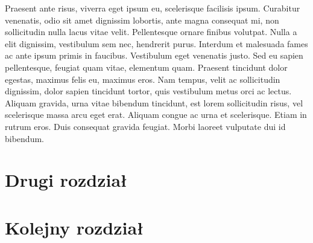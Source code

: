 \documentclass[a4paper,12pt,polish,twoside]{extreport}
\begin{document}
Praesent ante risus, viverra eget ipsum eu, scelerisque facilisis ipsum. Curabitur venenatis, odio sit amet dignissim lobortis, ante magna consequat mi, non sollicitudin nulla lacus vitae velit. Pellentesque ornare finibus volutpat. Nulla a elit dignissim, vestibulum sem nec, hendrerit purus. Interdum et malesuada fames ac ante ipsum primis in faucibus. Vestibulum eget venenatis justo. Sed eu sapien pellentesque, feugiat quam vitae, elementum quam. Praesent tincidunt dolor egestas, maximus felis eu, maximus eros. Nam tempus, velit ac sollicitudin dignissim, dolor sapien tincidunt tortor, quis vestibulum metus orci ac lectus. Aliquam gravida, urna vitae bibendum tincidunt, est lorem sollicitudin risus, vel scelerisque massa arcu eget erat. Aliquam congue ac urna et scelerisque. Etiam in rutrum eros. Duis consequat gravida feugiat. Morbi laoreet vulputate dui id bibendum.

\chapter{Drugi rozdział}

\chapter{Kolejny rozdział}

\newpage
\printbibliography[heading=bibintoc,title={Bibliografia}]

\newpage
\listoffigures

\newpage
\listofcodes

\newpage
\renewcommand{\listtablename}{Spis tabel}
\listoftables
\end{document}
